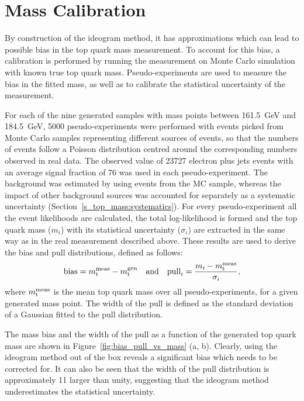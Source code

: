 \section{Mass Calibration}
\label{s_top_mass:calibration}

By construction of the ideogram method, it has approximations which can lead to possible bias in the top quark mass
measurement. To account for this bias, a calibration is performed by running the measurement on Monte Carlo simulation
with known true top quark mass. Pseudo-experiments are used to measure the bias in the fitted mass, as well as to
calibrate the statistical uncertainty of the measurement.

For each of the nine generated \ttbar samples with mass points between \SI{161.5}{\GeV} and \SI{184.5}{\GeV},
\num{5000} pseudo-experiments were performed with events picked from Monte Carlo samples representing different sources
of events, so that the numbers of events follow a Poisson distribution centred around the corresponding numbers observed
in real data. The observed value of \num{23727} electron plus jets events with an average signal fraction of
\SI{76}{\pc} was used in each pseudo-experiment. The background was estimated by using events from the \WpJets MC
sample, whereas the impact of other background sources was accounted for separately as a systematic uncertainty
(Section~\ref{s_top_mass:systematics}). For every pseudo-experiment all the event likelihoods are calculated, the total
log-likelihood is formed and the top quark mass ($m_i$) with its statistical uncertainty ($\sigma_i$) are extracted in
the same way as in the real measurement described above. These results are used to derive the bias and pull
distributions, defined as follows:
\begin{equation}
 \textrm{bias} = m_\mathrm{t}^{\rm meas} - m_\mathrm{t}^{\rm gen} \quad \text{and} \quad
 \textrm{pull}_i = \frac{m_i - m_\mathrm{t}^{\rm meas}}{\sigma_i},
\label{eq:bias_pull}
\end{equation}
where $m_\mathrm{t}^{\rm meas}$ is the mean top quark mass over all pseudo-experiments, for a given generated mass point. The
width of the pull is defined as the standard deviation of a Gaussian fitted to the pull distribution.

The mass bias and the width of the pull as a function of the generated top quark mass are shown in
Figure~\ref{fig:bias_pull_vs_mass} (a, b). Clearly, using the ideogram method out of the box reveals a significant bias
which needs to be corrected for. It can also be seen that the width of the pull distribution is approximately
\SI{11}{\pc} larger than unity, suggesting that the ideogram method underestimates the statistical uncertainty.


